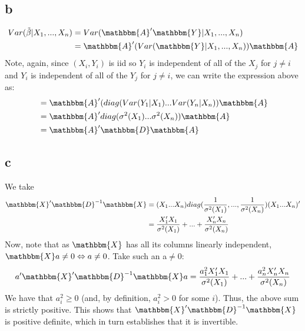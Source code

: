 \documentclass[12pt]{paper}
\begin{document}
\subsection*{b}
\begin{align*}
    Var(\tilde \beta | X_1,...,X_n) & =  Var( \mathbbm{A}' \mathbbm{Y} | X_1,...,X_n) \\
&= \mathbbm{A}'(Var( \mathbbm{Y} | X_1,...,X_n)) \mathbbm{A} \\
\end{align*}
Note, again, since $(X_i,Y_i)$ is iid so $Y_i$ is independent of all of the $X_j$ for $j \neq i$ and $Y_i$ is
independent of all of the $Y_j$ for $j \neq i$, we can write the expression above as:
\begin{align*}
&= \mathbbm{A}'(diag(Var( Y_1|X_1 )...Var( Y_n|X_n )) \mathbbm{A} \\
& = \mathbbm{A}'diag(\sigma^2(X_1 )...\sigma^2(X_n )) \mathbbm{A} \\ 
& = \mathbbm{A}'\mathbbm{D} \mathbbm{A}
\end{align*}

\subsection*{c}
We take
\begin{align*}
    \mathbbm{X}' \mathbbm{D}^{-1} \mathbbm{X} &= (X_1 ... X_n) diag(\frac{1}{\sigma^2(X_1)},...,\frac{1}{\sigma^2(X_n)})(X_1 ... X_n)'\\
    & =\frac{X_1'X_1}{\sigma^2(X_1)}+...+\frac{X_n'X_n}{\sigma^2(X_n)} \\
\end{align*}
Now, note that as $\mathbbm{X}$ has all its columns linearly independent, $\mathbbm{X}a \neq 0 \Leftrightarrow a \neq 0$. 
Take such an a$\neq 0$: 
\begin{align*}
    a' \mathbbm{X}' \mathbbm{D}^{-1} \mathbbm{X}a &= \frac{a^2_1X_1'X_1}{\sigma^2(X_1)}+...+\frac{a^2_nX_n'X_n}{\sigma^2(X_n)} \\
\end{align*}
We have that $a_i^2\geq 0$ (and, by definition, $a_i^2>0$ for some $i$). Thus, the above sum is strictly positive. This shows that $\mathbbm{X}' \mathbbm{D}^{-1} \mathbbm{X}$ is positive definite, which in turn establishes that it is invertible.
\end{document}
